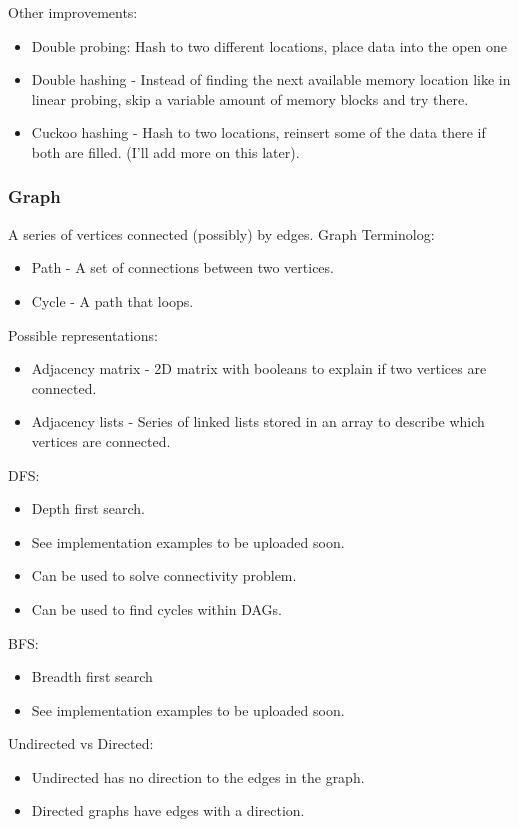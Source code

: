 \documentclass[11pt]{article}
\begin{document}
Other improvements:
\begin{itemize}
\item Double probing: Hash to two different locations, place data into the open one
\item Double hashing - Instead of finding the next available memory location like in linear probing, skip a variable amount of memory blocks and try there.
\item Cuckoo hashing - Hash to two locations, reinsert some of the data there if both are filled. (I'll add more on this later).
\end{itemize}
\subsubsection*{Graph}
\label{sec:org9874c28}
A series of vertices connected (possibly) by edges.
Graph Terminolog:
\begin{itemize}
\item Path - A set of connections between two vertices.
\item Cycle - A path that loops.
\end{itemize}

Possible representations:
\begin{itemize}
\item Adjacency matrix - 2D matrix with booleans to explain if two vertices are connected.
\item Adjacency lists - Series of linked lists stored in an array to describe which vertices are connected.
\end{itemize}

DFS:
\begin{itemize}
\item Depth first search.
\item See implementation examples to be uploaded soon.
\item Can be used to solve connectivity problem.
\item Can be used to find cycles within DAGs.
\end{itemize}
BFS:
\begin{itemize}
\item Breadth first search
\item See implementation examples to be uploaded soon.
\end{itemize}

Undirected vs Directed:
\begin{itemize}
\item Undirected has no direction to the edges in the graph.
\item Directed graphs have edges with a direction.
\end{itemize}
\end{document}
